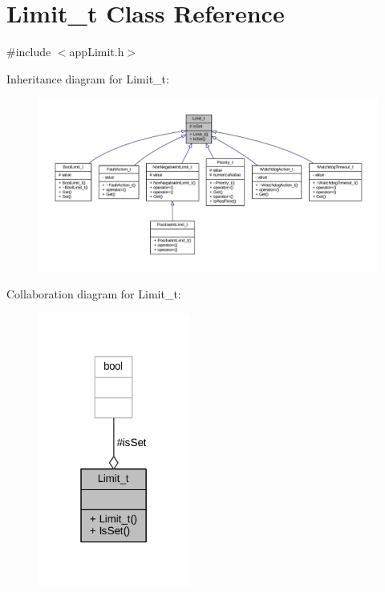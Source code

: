 \hypertarget{class_limit__t}{}\section{Limit\+\_\+t Class Reference}
\label{class_limit__t}


{\ttfamily \#include $<$app\+Limit.\+h$>$}



Inheritance diagram for Limit\+\_\+t\+:
\nopagebreak
\begin{figure}[H]
\begin{center}
\leavevmode
\includegraphics[width=350pt]{class_limit__t__inherit__graph}
\end{center}
\end{figure}


Collaboration diagram for Limit\+\_\+t\+:
\nopagebreak
\begin{figure}[H]
\begin{center}
\leavevmode
\includegraphics[width=142pt]{class_limit__t__coll__graph}
\end{center}
\end{figure}
